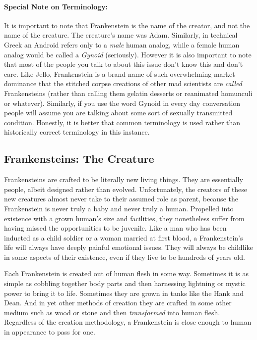 \paragraph{Special Note on Terminology:} It is important to note that Frankenstein is the name of the creator, and not the name of the creature. The creature's name was Adam. Similarly, in technical Greek an Android refers only to a \textit{male} human analog, while a female human analog would be called a \textit{Gynoid} (seriously). However it is also important to note that most of the people you talk to about this issue don't know this and don't care. Like Jello, Frankenstein is a brand name of such overwhelming market dominance that the stitched corpse creations of other mad scientists are \textit{called} Frankensteins (rather than calling them gelatin desserts or reanimated homunculi or whatever). Similarly, if you use the word Gynoid in every day conversation people will assume you are talking about some sort of sexually transmitted condition. Honestly, it is better that common terminology is used rather than historically correct terminology in this instance.

\subsection[Frankensteins]{Frankensteins: The Creature} 

Frankensteins are crafted to be literally new living things. They are essentially people, albeit designed rather than evolved. Unfortunately, the creators of these new creatures almost never take to their assumed role as parent, because the Frankenstein is never truly a baby and never truly a human. Propelled into existence with a grown human's size and facilities, they nonetheless suffer from having missed the opportunities to be juvenile. Like a man who has been inducted as a child soldier or a woman married at first blood, a Frankenstein's life will always have deeply painful emotional issues. They will always be childlike in some aspects of their existence, even if they live to be hundreds of years old.

Each Frankenstein is created out of human flesh in some way. Sometimes it is as simple as cobbling together body parts and then harnessing lightning or mystic power to bring it to life. Sometimes they are grown in tanks like the Hank and Dean. And in yet other methods of creation they are crafted in some other medium such as wood or stone and then \textit{transformed} into human flesh. Regardless of the creation methodology, a Frankenstein is close enough to human in appearance to pass for one. 

